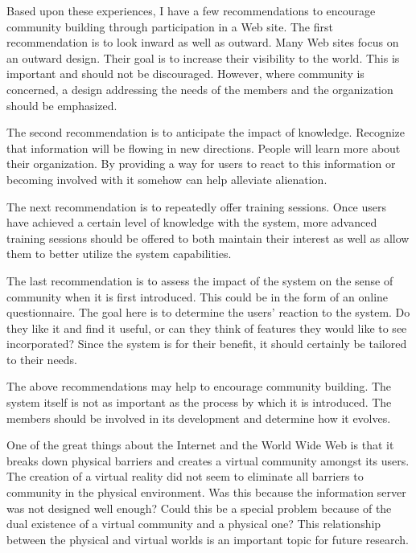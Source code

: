 Based upon these experiences, I have a few recommendations to encourage
community building through participation in a Web site.  The first
recommendation is to look inward as well as outward.  Many Web sites focus on
an outward design.  Their goal is to increase their visibility to the world.
This is important and should not be discouraged.  However, where community is
concerned, a design addressing the needs of the members and the organization
should be emphasized.

The second recommendation is to anticipate the impact of knowledge.  Recognize
that information will be flowing in new directions.  People will learn more
about their organization.  By providing a way for users to react to this
information or becoming involved with it somehow can help alleviate alienation.

The next recommendation is to repeatedly offer training sessions.  Once users
have achieved a certain level of knowledge with the system, more advanced
training sessions should be offered to both maintain their interest as well as
allow them to better utilize the system capabilities.

The last recommendation is to assess the impact of the system on the sense of
community when it is first introduced.  This could be in the form of an online
questionnaire.  The goal here is to determine the users' reaction to the
system.  Do they like it and find it useful, or can they think of features they
would like to see incorporated?  Since the system is for their benefit, it
should certainly be tailored to their needs.

The above recommendations may help to encourage community building.  The system
itself is not as important as the process by which it is introduced.  The
members should be involved in its development and determine how it evolves.

One of the great things about the Internet and the World Wide Web is that it
breaks down physical barriers and creates a virtual community amongst its
users.  The creation of a virtual reality did not seem to eliminate all
barriers to community in the physical environment.  Was this because the
information server was not designed well enough?  Could this be a special
problem because of the dual existence of a virtual community and a physical
one?  This relationship between the physical and virtual worlds is an important
topic for future research.





